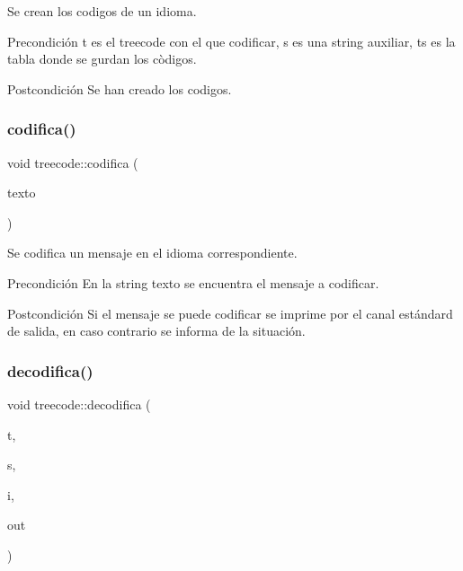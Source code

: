 Se crean los codigos de un idioma. 

\begin{DoxyPrecond}{Precondición}
t es el treecode con el que codificar, s es una string auxiliar, ts es la tabla donde se gurdan los còdigos. 
\end{DoxyPrecond}
\begin{DoxyPostcond}{Postcondición}
Se han creado los codigos. 
\end{DoxyPostcond}
\mbox{\label{classtreecode_a70aadac29b9785276ba4f1a4bca7515e}} 
\subsubsection{\texorpdfstring{codifica()}{codifica()}}
{\footnotesize\ttfamily void treecode\+::codifica (\begin{DoxyParamCaption}\item[{const string \&}]{texto }\end{DoxyParamCaption})}



Se codifica un mensaje en el idioma correspondiente. 

\begin{DoxyPrecond}{Precondición}
En la string texto se encuentra el mensaje a codificar. 
\end{DoxyPrecond}
\begin{DoxyPostcond}{Postcondición}
Si el mensaje se puede codificar se imprime por el canal estándard de salida, en caso contrario se informa de la situación. 
\end{DoxyPostcond}
\mbox{\label{classtreecode_a446c078d3e137141bc56c6e44462322d}} 
\subsubsection{\texorpdfstring{decodifica()}{decodifica()}}
{\footnotesize\ttfamily void treecode\+::decodifica (\begin{DoxyParamCaption}\item[{const Bin\+Tree$<$ pair$<$ string, int $>$ $>$ \&}]{t,  }\item[{const string \&}]{s,  }\item[{int \&}]{i,  }\item[{string \&}]{out }\end{DoxyParamCaption})}



